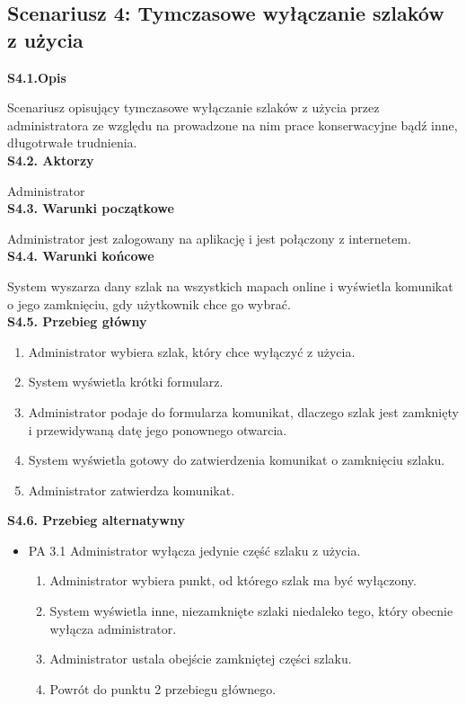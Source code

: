     \subsection*{Scenariusz 4: Tymczasowe wyłączanie szlaków z użycia}
    \textbf{S4.1.Opis} \par
    Scenariusz opisujący tymczasowe wyłączanie szlaków z użycia przez administratora ze względu na prowadzone na nim prace konserwacyjne bądź inne, długotrwałe trudnienia. \\
    \textbf{S4.2. Aktorzy} \par
    Administrator \\
    \textbf{S4.3. Warunki początkowe} \par
    Administrator jest zalogowany na aplikację i jest połączony z internetem. \\
    \textbf{S4.4. Warunki końcowe} \par
    System wyszarza dany szlak na wszystkich mapach online i wyświetla komunikat o jego zamknięciu, gdy użytkownik chce go wybrać.\\
    \textbf{S4.5. Przebieg główny} \par
    \begin{enumerate}
        \item Administrator wybiera szlak, który chce wyłączyć z użycia.
        \item System wyświetla krótki formularz.
        \item Administrator podaje do formularza komunikat, dlaczego szlak jest zamknięty i przewidywaną datę jego ponownego otwarcia.
        \item System wyświetla gotowy do zatwierdzenia komunikat o zamknięciu szlaku.
        \item Administrator zatwierdza komunikat.
    \end{enumerate}
    \textbf{S4.6. Przebieg alternatywny} \par
    \begin{itemize}
        \item []PA 3.1 Administrator wyłącza jedynie część szlaku z użycia.
        \begin{enumerate}
            \item Administrator wybiera punkt, od którego szlak ma być wyłączony.
            \item System wyświetla inne, niezamknięte szlaki niedaleko tego, który obecnie wyłącza administrator.
            \item Administrator ustala obejście zamkniętej części szlaku.
            \item Powrót do punktu 2 przebiegu głównego.
        \end{enumerate}
    \end{itemize}
